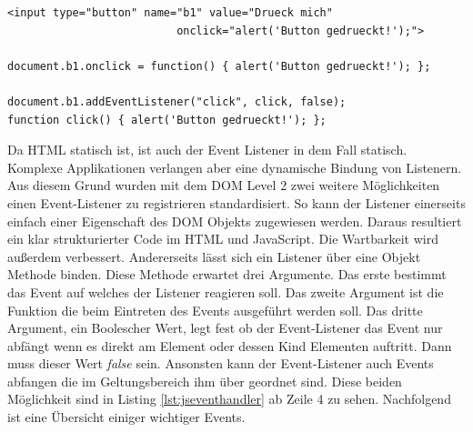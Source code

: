 \documentclass[12pt,a4paper,bibliography=totocnumbered,listof=totocnumbered]{scrartcl}
\begin{document}
	\vspace{1em}
	\begin{lstlisting}[caption=JavaScript Event-Handler Beispiek, label=lst:jseventhandler]
<input type="button" name="b1" value="Drueck mich"
                          onclick="alert('Button gedrueckt!');">

document.b1.onclick = function() { alert('Button gedrueckt!'); };

document.b1.addEventListener("click", click, false);
function click() { alert('Button gedrueckt!'); };
	\end{lstlisting}

Da HTML statisch ist, ist auch der Event Listener in dem Fall statisch. Komplexe Applikationen verlangen aber eine dynamische Bindung von Listenern. Aus diesem Grund wurden mit dem DOM Level 2 zwei weitere Möglichkeiten einen Event-Listener zu registrieren standardisiert. So kann der Listener einerseits einfach einer Eigenschaft des DOM Objekts zugewiesen werden. Daraus resultiert ein klar strukturierter Code im HTML und JavaScript. Die Wartbarkeit wird außerdem verbessert. Andererseits lässt sich ein Listener über eine Objekt Methode binden. Diese Methode erwartet drei Argumente. Das erste bestimmt das Event auf welches der Listener reagieren soll. Das zweite Argument ist die Funktion die beim Eintreten des Events ausgeführt werden soll. Das dritte Argument, ein Boolescher Wert, legt fest ob der Event-Listener das Event nur abfängt wenn es direkt am Element oder dessen Kind Elementen auftritt. Dann muss dieser Wert \textit{false} sein. Ansonsten kann der Event-Listener auch Events abfangen die im Geltungsbereich ihm über geordnet sind. Diese beiden Möglichkeit sind in Listing \ref{lst:jseventhandler} ab Zeile 4 zu sehen. Nachfolgend ist eine Übersicht einiger wichtiger Events.
\end{document}
